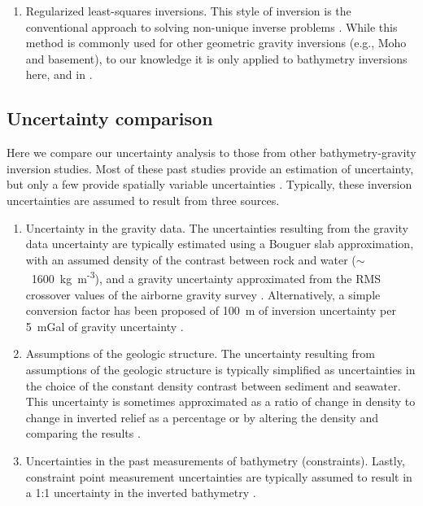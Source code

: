 \begin{enumerate}
    \item Regularized least-squares inversions. This style of inversion is the conventional approach to solving non-unique inverse problems \citep{asterparameter2018}. While this method is commonly used for other geometric gravity inversions (e.g., Moho and basement), to our knowledge it is only applied to bathymetry inversions here, and in \citet{vaňkováhigh2023}.
\end{enumerate}

\subsection{Uncertainty comparison}

Here we compare our uncertainty analysis to those from other bathymetry-gravity inversion studies. Most of these past studies provide an estimation of uncertainty, but only a few provide spatially variable uncertainties \citep[e.g.,][]{anbathymetry2019, mutosubglacial2016}. Typically, these inversion uncertainties are assumed to result from three sources.

\begin{enumerate}
    \item Uncertainty in the gravity data. The uncertainties resulting from the gravity data uncertainty are typically estimated using a Bouguer slab approximation, with an assumed density of the contrast between rock and water ($\sim$~1600~kg~m\textsuperscript{-3}), and a gravity uncertainty approximated from the RMS crossover values of the airborne gravity survey \citep[e.g.,][]{tintoross2019, constantinoseafloor2020, boghosianresolving2015}. Alternatively, a simple conversion factor has been proposed of 100~m of inversion uncertainty per 5~mGal of gravity uncertainty \citep{anbathymetry2019, anbathymetry2019a}.

    \item Assumptions of the geologic structure. The uncertainty resulting from assumptions of the geologic structure is typically simplified as uncertainties in the choice of the constant density contrast between sediment and seawater. This uncertainty is sometimes approximated as a ratio of change in density to change in inverted relief as a percentage \citep[e.g., $\sim$3\% relief for 50~kg~m\textsuperscript{-3}][]{tintoross2019} or by altering the density and comparing the results \citep{boghosianresolving2015}.

    \item Uncertainties in the past measurements of bathymetry (constraints). Lastly, constraint point measurement uncertainties are typically assumed to result in a 1:1 uncertainty in the inverted bathymetry \citep[e.g.,][]{tintoross2019, boghosianresolving2015}.
\end{enumerate}

